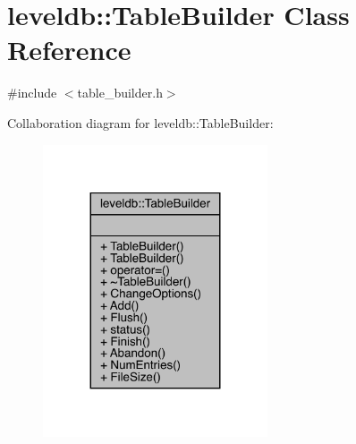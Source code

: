 \hypertarget{classleveldb_1_1_table_builder}{}\section{leveldb\+::Table\+Builder Class Reference}
\label{classleveldb_1_1_table_builder}


{\ttfamily \#include $<$table\+\_\+builder.\+h$>$}



Collaboration diagram for leveldb\+::Table\+Builder\+:
\nopagebreak
\begin{figure}[H]
\begin{center}
\leavevmode
\includegraphics[width=188pt]{classleveldb_1_1_table_builder__coll__graph}
\end{center}
\end{figure}
